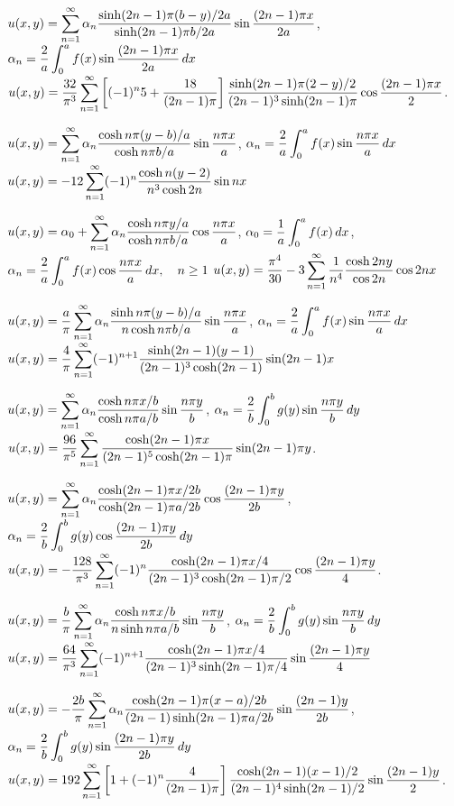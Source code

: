 $\displaystyle
u(x,y)=\sum_{n=1}^\infty\alpha_n\frac{\sinh(2n-1)\pi(b-y)/2a}{\sinh(2n-1)\pi b/2a}\sin
\frac{(2n-1)\pi x}{2a}$,
$\displaystyle\alpha_n=\frac{2}{a}\int_0^a
f(x)\sin\frac{(2n-1)\pi x}{2a}\,dx$
$u(x,y)=\displaystyle\frac{32}{\pi^3}\sum_{n=1}^\infty\left[
(-1)^n5+\frac{18}{(2n-1)\pi}\right]
\frac{\sinh(2n-1)\pi(2-y)/2}{(2n-1)^3\sinh(2n-1)\pi}
\cos\frac{(2n-1)\pi x}{2}$.


$\displaystyle u(x,y)=\sum_{n=1}^\infty\alpha_n\frac{\cosh n\pi(y-b)/a}{\cosh n\pi b/a}\sin
\frac{n\pi x}{a}$, \quad
$\displaystyle\alpha_n=\frac{2}{a}\int_0^a f(x)\sin
\frac{n\pi x}{a}\,dx$
$u(x,y)=\displaystyle-12\sum_{n=1}^\infty(-1)^n\frac{\cosh n(y-2)}{n^3\cosh2n}
\sin nx$


$\displaystyle u(x,y)=\alpha_0+\sum_{n=1}^\infty\alpha_n\frac{\cosh n\pi y/a
}{\cosh n\pi b/a}\cos
\frac{n\pi x}{a}$,
$\displaystyle\alpha_0=\frac{1}{a}\int_0^a f(x)\,dx$,
$\displaystyle\alpha_n=\frac{2}{a}\int_0^a f(x)\cos
\frac{n\pi x}{a}\,dx,\quad n\ge1$
$\displaystyle u(x,y)=\frac{\pi^4}{30}-3\sum_{n=1}^\infty\frac{1}{n^4}\frac{\cosh2ny}{\cos2n}\cos 2nx$


$\displaystyle u(x,y)=\frac{a}{\pi}\sum_{n=1}^\infty\alpha_n\frac{\sinh n\pi
(y-b)/a}{n\cosh n\pi b/a}\sin
\frac{n\pi x}{a}$, \quad
$\displaystyle\alpha_n=\frac{2}{a}\int_0^a
f(x)\sin \frac{n\pi x}{a}\,dx$
$u(x,y)=\displaystyle\frac{4}{\pi}\sum_{n=1}^\infty(-1)^{n+1}
\frac{\sinh(2n-1)(y-1)}{(2n-1)^3\cosh(2n-1)}
\sin(2n-1)x$


$\displaystyle u(x,y)=\sum_{n=1}^\infty\alpha_n\frac{\cosh n\pi x/b}{\cosh n\pi a/b}
\sin\frac{n\pi y}{b}$,\quad
$\displaystyle\alpha_n=\frac{2}{b}\int_0^b g(y)\sin
\frac{n\pi y}{b}\,dy$
$u(x,y)=\displaystyle\frac{96}{\pi^5}\sum_{n=1}^\infty\frac{\cosh(2n-1)\pi x
}{(2n-1)^5\cosh(2n-1)\pi}\sin(2n-1)\pi y$.

$\displaystyle u(x,y)=\sum_{n=1}^\infty\alpha_n\frac{\cosh(2n-1)\pi x/2b}{\cosh(2n-1)\pi a/2b}
\cos\frac{(2n-1)\pi y}{2b}$,\quad
$\displaystyle\alpha_n=\frac{2}{b}\int_0^b g(y)\cos
\frac{(2n-1)\pi y}{2b}\,dy$
$u(x,y)=-\displaystyle
\frac{128}{\pi^3}\sum_{n=1}^\infty(-1)^n\frac{\cosh(2n-1)\pi x/4}{
(2n-1)^3\cosh(2n-1)\pi/2}\cos\frac{(2n-1)\pi y}{4}$.

$\displaystyle u(x,y)=\frac{b}{\pi}\sum_{n=1}^\infty\alpha_n
\frac{\cosh n\pi x/b}{n \sinh n\pi a/b}
\sin\frac{n\pi y}{b}$,\quad
$\displaystyle\alpha_n=\frac{2}{b}\int_0^b g(y)\sin
\frac{n\pi y}{b}\,dy$
$u(x,y)=\displaystyle\frac{64}{\pi^3}\sum_{n=1}^\infty(-1)^{n+1}
\frac{\cosh(2n-1)\pi x/4}{(2n-1)^3\sinh(2n-1)\pi/4}
\sin\frac{(2n-1)\pi y}{4}$

$\displaystyle
u(x,y)=-\frac{2b}{\pi}\sum_{n=1}^\infty\alpha_n\frac{\cosh(2n-1)\pi(x-a)/2b
}{(2n-1)\sinh(2n-1)\pi a/2b}
\sin\frac{(2n-1) y}{2b}$,\quad
$\displaystyle\alpha_n=\frac{2}{b}\int_0^b g(y)\sin
\frac{(2n-1)\pi y}{2b}\,dy$
$u(x,y)=\displaystyle192\sum_{n=1}^\infty
\left[1+(-1)^n\frac{4}{(2n-1)\pi}\right]
\frac{\cosh(2n-1)(x-1)/2}{(2n-1)^4\sinh(2n-1)/2}
\sin\frac{(2n-1)y}{2}$.

